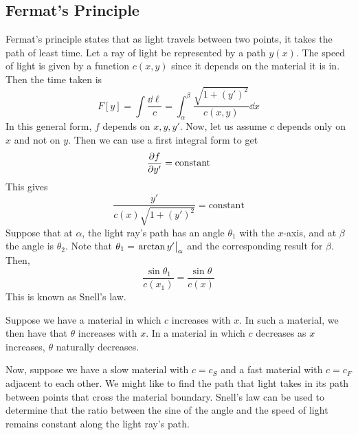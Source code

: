 \subsection{Fermat's Principle}
Fermat's principle states that as light travels between two points, it takes the path of least time.
Let a ray of light be represented by a path \( y(x) \).
The speed of light is given by a function \( c(x, y) \) since it depends on the material it is in.
Then the time taken is
\[
	F[y] = \int \frac{\dd{\ell}}{c} = \int_\alpha^\beta \frac{\sqrt{1 + (y')^2}}{c(x, y)} \dd{x}
\]
In this general form, \( f \) depends on \( x, y, y' \).
Now, let us assume \( c \) depends only on \( x \) and not on \( y \).
Then we can use a first integral form to get
\[
	\pdv{f}{y'} = \text{constant}
\]
This gives
\[
	\frac{y'}{c(x)\sqrt{1 + (y')^2}} = \text{constant}
\]
Suppose that at \( \alpha \), the light ray's path has an angle \( \theta_1 \) with the \( x \)-axis, and at \( \beta \) the angle is \( \theta_2 \).
Note that \( \theta_1 = \eval{\arctan y'}_{\alpha} \) and the corresponding result for \( \beta \).
Then,
\[
	\frac{\sin\theta_1}{c(x_1)} = \frac{\sin\theta}{c(x)}
\]
This is known as Snell's law.

Suppose we have a material in which \( c \) increases with \( x \).
In such a material, we then have that \( \theta \) increases with \( x \).
In a material in which \( c \) decreases as \( x \) increases, \( \theta \) naturally decreases.

Now, suppose we have a slow material with \( c = c_S \) and a fast material with \( c = c_F \) adjacent to each other.
We might like to find the path that light takes in its path between points that cross the material boundary.
Snell's law can be used to determine that the ratio between the sine of the angle and the speed of light remains constant along the light ray's path.
